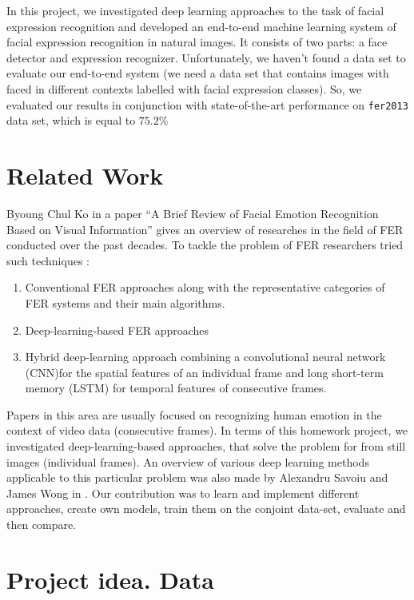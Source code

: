 In this project, we investigated deep learning approaches to the task of facial expression recognition and developed an end-to-end machine learning system of facial expression recognition in natural images. It consists of two parts: a face detector and expression recognizer. Unfortunately, we haven't found a data set to evaluate our end-to-end system (we need a data set that contains images with faced in different contexts labelled with facial expression classes). So, we evaluated our results in conjunction with state-of-the-art performance on \texttt{fer2013} data set, which is equal to $75.2\%$

\section{Related Work}

Byoung Chul Ko in a paper “A Brief Review of Facial Emotion Recognition Based on Visual Information”\cite{FERreview} gives an overview of researches in the field of FER conducted over the past decades. To tackle the problem of FER researchers tried such techniques : 
\begin{enumerate}
\item Conventional  FER  approaches along with the representative categories of FER systems and their main algorithms. 
\item Deep-learning-based FER approaches
\item Hybrid deep-learning approach combining a convolutional neural network (CNN)for the spatial features of an individual frame and long short-term memory (LSTM) for temporal features of consecutive frames.
\end{enumerate}

Papers in this area are usually focused on recognizing human emotion in the context of video data (consecutive frames)\cite{video1}. In terms of this homework project, we investigated deep-learning-based approaches, that solve the problem for from still images (individual frames). An overview of various deep learning methods applicable to this particular problem was also made by Alexandru Savoiu and James Wong in \cite{deepNN}. Our contribution was to learn and implement different approaches, create own models, train them on the conjoint data-set, evaluate and then compare.

\section{Project idea. Data}

